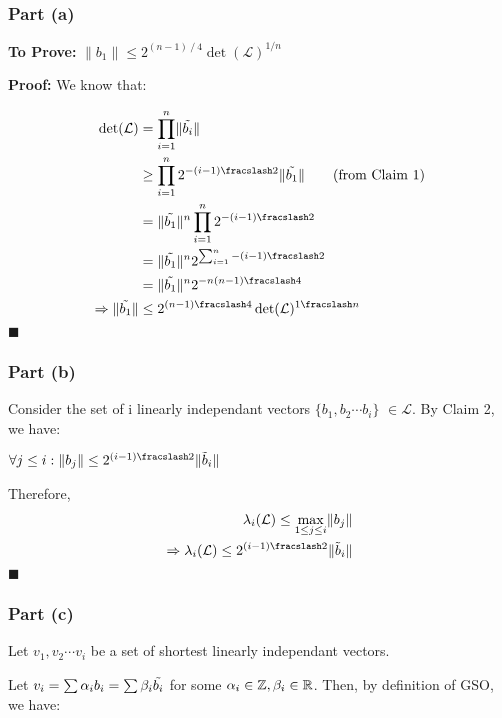 \subsubsection{Part (a)}

\textbf{To Prove: } $\lVert b_1 \rVert \le 2^{(n-1)\fracslash 4} \det(\mathcal{L})^{1/n}$

\textbf{Proof: } We know that:

\begin{align*}
    \det(\mathcal{L}) &= \prod_{i=1}^n \lVert \Tilde{b_i} \rVert \\
    &\ge \prod_{i=1}^n 2^{-(i-1) \fracslash 2} \lVert \Tilde{b_1} \rVert \tag{from Claim 1} \\
    &= \lVert \Tilde{b_1} \rVert^n \prod_{i=1}^n 2^{-(i-1) \fracslash 2} \\ 
    &= \lVert \Tilde{b_1} \rVert^n 2^{\sum_{i=1}^n -(i-1) \fracslash 2} \\
    &= \lVert \Tilde{b_1} \rVert^n 2^{-n(n-1) \fracslash 4} \\
    \Rightarrow \lVert \Tilde{b_1} \rVert &\le 2^{(n-1) \fracslash 4}\det(\mathcal{L})^{1 \fracslash n}
\end{align*}
\hfill$\blacksquare$
\subsubsection{Part (b)}
Consider the set of i linearly independant vectors $\{b_1, b_2 \cdots b_i\}$ $\in \mathcal{L}$. By Claim 2, we have:

$\forall j \le i: \lVert b_j \rVert \le 2^{(i-1) \fracslash 2} \lVert \Tilde{b}_i \rVert$

Therefore,
\begin{align*}
\lambda_i(\mathcal{L}) \le \max_{1\leq j\leq i} \lVert b_j \rVert \\
\Rightarrow \lambda_i(\mathcal{L}) \le 2^{(i-1) \fracslash 2} \lVert \Tilde{b}_i \rVert
\end{align*}
\hfill$\blacksquare$

\subsubsection{Part (c)}

Let $v_1, v_2 \cdots v_i$ be a set of shortest linearly independant vectors.

Let $v_i = \sum \alpha_i b_i = \sum \beta_i \Tilde{b_i}$ for some $\alpha_i \in \mathbb{Z}, \beta_i \in \mathbb{R}$. Then, by definition of GSO, we have:


